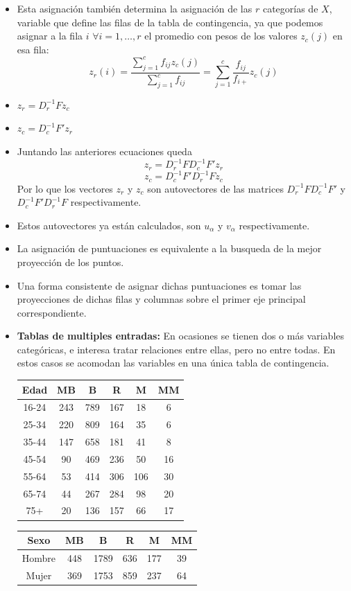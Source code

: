 \begin{itemize}
    \item Esta asignación también determina la asignación de las $r$ categorías de $X$, variable que define las filas de la tabla de contingencia, ya que podemos asignar a la fila $i$ $\forall i=1,\dots,r$ el promedio con pesos de los valores $z_c(j)$ en esa fila:
    \[
        z_r(i)=\frac{\sum_{j=1}^c f_{ij}z_c(j)}{\sum_{j=1}^c f_{ij}}=\sum_{j=1}^c \frac{f_{ij}}{f_{i+}}z_c(j)
    \]
    \newpage
    \item $z_r=D^{-1}_rFz_c$
    \item $z_c=D^{-1}_cF'z_r$
    \item Juntando las anteriores ecuaciones queda
    \[
        z_r=D^{-1}_rFD^{-1}_cF'z_r
    \]
    \[
        z_c=D^{-1}_cF'D^{-1}_rFz_c
    \]
    Por lo que los vectores $z_r$ y $z_c$ son autovectores de las matrices $D^{-1}_rFD^{-1}_cF'$ y $D^{-1}_cF'D^{-1}_rF$ respectivamente.
    \item Estos autovectores ya están calculados, son $u_\alpha$ y $v_\alpha$ respectivamente.
    \item La asignación de puntuaciones es equivalente a la busqueda de la mejor proyección de los puntos.
    \item Una forma consistente de asignar dichas puntuaciones es tomar las proyecciones de dichas filas y columnas sobre el primer eje principal correspondiente.
    \item \textbf{Tablas de multiples entradas: } En ocasiones se tienen dos o más variables categóricas, e interesa tratar relaciones entre ellas, pero no entre todas. En estos casos se acomodan las variables en una única tabla de contingencia.
    
    \vspace*{2mm}

    \begin{tabular}{|c|c|c|c|c|c|}
        \hline
        Edad    &  MB  &  B  &  R  &  M  &  MM  \\
        \hline
        16-24   &  243 & 789 & 167 &  18 &    6 \\
        25-34   &  220 & 809 & 164 &  35 &    6 \\
        35-44   &  147 & 658 & 181 &  41 &    8 \\
        45-54   &   90 & 469 & 236 &  50 &   16 \\
        55-64   &   53 & 414 & 306 & 106 &   30 \\
        65-74   &   44 & 267 & 284 &  98 &   20 \\
        75+     &   20 & 136 & 157 &  66 &   17 \\
        \hline
    \end{tabular}
    \smallskip
    \begin{tabular}{|c|c|c|c|c|c|}
        \hline
        Sexo    &  MB  &   B  &  R  &  M  &  MM  \\
        \hline
        Hombre  &  448 & 1789 & 636 & 177 &   39 \\
        Mujer   &  369 & 1753 & 859 & 237 &   64 \\
        \hline
    \end{tabular}
    

\end{itemize}
